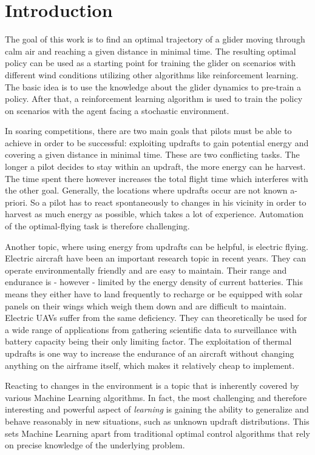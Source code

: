 
\chapter{Introduction}

The goal of this work is to find an optimal trajectory of a glider moving through calm air and reaching a given distance in minimal time. The resulting optimal policy can be used as a starting point for training the glider on scenarios with different wind conditions utilizing other algorithms like reinforcement learning. The basic idea is to use the knowledge about the glider dynamics to pre-train a policy. After that, a reinforcement learning algorithm is used to train the policy on scenarios with the agent facing a stochastic environment.

In soaring competitions, there are two main goals that pilots must be able to achieve in order to be successful: exploiting updrafts to gain potential energy and covering a given distance in minimal time. These are two conflicting tasks. The longer a pilot decides to stay within an updraft, the more energy can he harvest. The time spent there however increases the total flight time which interferes with the other goal. Generally, the locations where updrafts occur are not known a-priori. So a pilot has to react spontaneously to changes in his vicinity in order to harvest as much energy as possible, which takes a lot of experience. Automation of the optimal-flying task is therefore challenging.

Another topic, where using energy from updrafts can be helpful, is electric flying. Electric aircraft have been an important research topic in recent years. They can operate environmentally friendly and are easy to maintain. Their range and endurance is - however - limited by the energy density of current batteries. This means they either have to land frequently to recharge or be equipped with solar panels on their wings which weigh them down and are difficult to maintain. Electric UAVs suffer from the same deficiency. They can theoretically be used for a wide range of applications from gathering scientific data to surveillance with battery capacity being their only limiting factor. The exploitation of thermal updrafts is one way to increase the endurance of an aircraft without changing anything on the airframe itself, which makes it relatively cheap to implement.

Reacting to changes in the environment is a topic that is inherently covered by various Machine Learning algorithms. In fact, the most challenging and therefore interesting and powerful aspect of \textit{learning} is gaining the ability to generalize and behave reasonably in new situations, such as unknown updraft distributions. This sets Machine Learning apart from traditional optimal control algorithms that rely on precise knowledge of the underlying problem.

